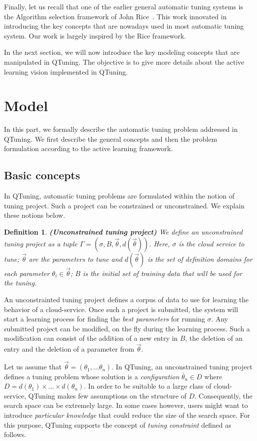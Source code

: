 \documentclass[10pt, conference, compsocconf]{IEEEtran}
\newtheorem{definition}[theorem]{Definition}
\begin{document}
Finally, let us recall that one of the earlier general automatic tuning systems
is the Algorithm selection framework of John Rice~\cite{Rice}. This work
innovated in introducing the key concepts that are nowadays used in most
automatic tuning system. Our work is largely inspired by the Rice framework.

In the next section, we will now introduce the key modeling concepts that are
manipulated in QTuning. The objective is to give more details about the active
learning vision implemented in QTuning.

\section{Model} \label{Model}

In this part, we formally describe the automatic tuning problem addressed in QTuning. We first describe
the general concepts and then the problem formulation according to the active learning framework.
 \subsection{Basic concepts}

In QTuning, automatic tuning problems are formulated within the notion of tuning project.  Such
a project can be  constrained or unconstrained. We explain these notions below.

\begin{definition}{\bf (Unconstrained tuning project)}
We define an unconstrained tuning project as a tuple $ \Gamma = (\sigma, B, \vec{\theta}, d(\vec{\theta}))$. Here, $\sigma$ is the cloud service to tune;
$\vec{\theta}$ are the parameters to tune and $d(\vec{\theta})$ is the set of definition domains for each parameter
$\theta_i \in \vec{\theta}$; $B$ is the initial set of training data that will be used for the tuning.
\end{definition}

An unconstrainted tuning project defines a corpus of data to use for learning the behavior of a cloud-service.
Once such a project is submitted, the system will start a learning process for finding the {\it best parameters} for
running $\sigma$. Any submitted project can be modified, on the fly during the learning process. Such a modification can consist of
the addition of a new entry in $B$, the deletion of an entry and the deletion of a parameter from $\vec{\theta}$.

Let us assume that $\vec{\theta} = (\theta_1,\dots \theta_n)$. In QTuning, an unconstrained tuning project defines
a tuning problem whose solution is a {\it configuration} $\bar{\theta}_u \in D$ where $D = d(\theta_1) \times \dots  \times d(\theta_n)$.
In order to be suitable to a large class of cloud-service, QTuning makes few assumptions on the structure of $D$.
Consequently, the search space can be extremely large.
In some cases however, users might want to introduce {\it particular knowledge} that could reduce the size of the search space.
For this purpose, QTuning supports the concept of {\it tuning constraint} defined as follows.
\end{document}
